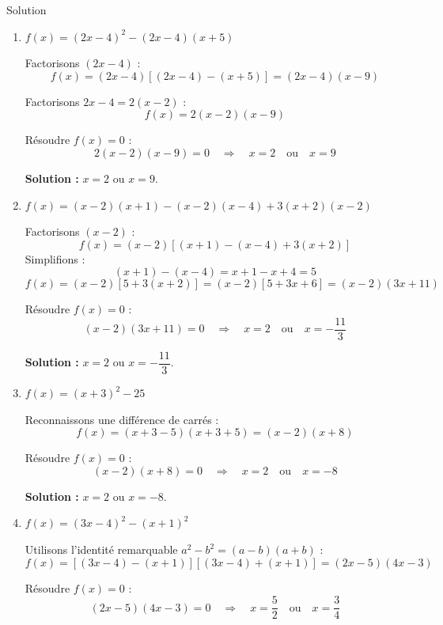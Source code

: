 \documentclass[a4paper,12pt]{article}
\begin{document}
\begin{solutionbox}{Solution}
\begin{enumerate}
    Résoudre \( f(x) = 0 \) :
    \[
    (x + 3)(4x - 9) = 0 \quad \Rightarrow \quad x = -3 \quad \text{ou} \quad x = \dfrac{9}{4}
    \]

    \textbf{Solution :} \( x = -3 \) ou \( x = \dfrac{9}{4} \).

    \item \( f(x) = (2x - 4)^2 - (2x - 4)(x + 5) \)

    Factorisons \( (2x - 4) \) :
    \[
    f(x) = (2x - 4)[(2x - 4) - (x + 5)] = (2x - 4)(x - 9)
    \]

    Factorisons \( 2x - 4 = 2(x - 2) \) :
    \[
    f(x) = 2(x - 2)(x - 9)
    \]

    Résoudre \( f(x) = 0 \) :
    \[
    2(x - 2)(x - 9) = 0 \quad \Rightarrow \quad x = 2 \quad \text{ou} \quad x = 9
    \]

    \textbf{Solution :} \( x = 2 \) ou \( x = 9 \).

    \item \( f(x) = (x - 2)(x + 1) - (x - 2)(x - 4) + 3(x + 2)(x - 2) \)

    Factorisons \( (x - 2) \) :
    \[
    f(x) = (x - 2)\left[ (x + 1) - (x - 4) + 3(x + 2) \right]
    \]
    Simplifions :
    \[
    (x + 1) - (x - 4) = x + 1 - x + 4 = 5
    \]
    \[
    f(x) = (x - 2)[5 + 3(x + 2)] = (x - 2)[5 + 3x + 6] = (x - 2)(3x + 11)
    \]

    Résoudre \( f(x) = 0 \) :
    \[
    (x - 2)(3x + 11) = 0 \quad \Rightarrow \quad x = 2 \quad \text{ou} \quad x = -\dfrac{11}{3}
    \]

    \textbf{Solution :} \( x = 2 \) ou \( x = -\dfrac{11}{3} \).

    \item \( f(x) = (x + 3)^2 - 25 \)

    Reconnaissons une différence de carrés :
    \[
    f(x) = (x + 3 - 5)(x + 3 + 5) = (x - 2)(x + 8)
    \]

    Résoudre \( f(x) = 0 \) :
    \[
    (x - 2)(x + 8) = 0 \quad \Rightarrow \quad x = 2 \quad \text{ou} \quad x = -8
    \]

    \textbf{Solution :} \( x = 2 \) ou \( x = -8 \).

    \item \( f(x) = (3x - 4)^2 - (x + 1)^2 \)

    Utilisons l'identité remarquable \( a^2 - b^2 = (a - b)(a + b) \) :
    \[
    f(x) = [(3x - 4) - (x + 1)][(3x - 4) + (x + 1)] = (2x - 5)(4x - 3)
    \]

    Résoudre \( f(x) = 0 \) :
    \[
    (2x - 5)(4x - 3) = 0 \quad \Rightarrow \quad x = \dfrac{5}{2} \quad \text{ou} \quad x = \dfrac{3}{4}
    \]


\end{enumerate}
\end{solutionbox}
\end{document}
